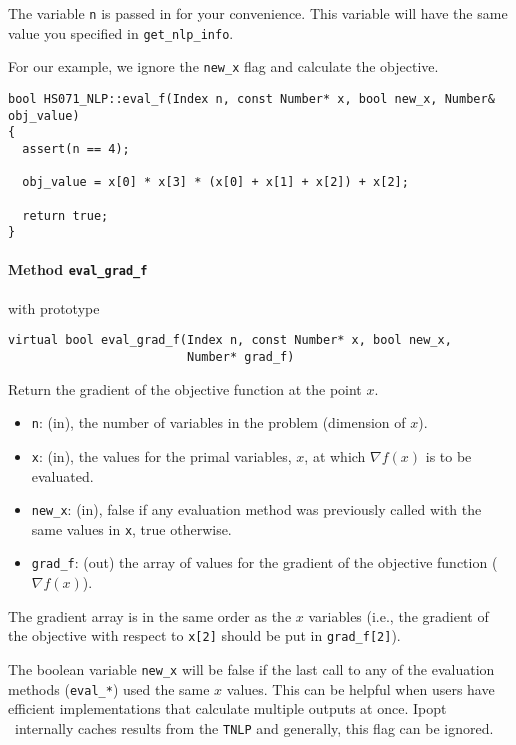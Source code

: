 \documentclass[10pt]{article}
\newcommand{\Ipopt}{{\sc Ipopt }}
\begin{document}
The variable {\tt n} is passed in for your convenience. This variable
will have the same value you specified in {\tt get\_nlp\_info}.

For our example, we ignore the {\tt new\_x} flag and calculate the objective.

\begin{footnotesize}
\begin{verbatim}
bool HS071_NLP::eval_f(Index n, const Number* x, bool new_x, Number& obj_value)
{
  assert(n == 4);

  obj_value = x[0] * x[3] * (x[0] + x[1] + x[2]) + x[2];

  return true;
}
\end{verbatim}
\end{footnotesize}

\paragraph{Method {\texttt{eval\_grad\_f}}} with prototype
\begin{verbatim}
virtual bool eval_grad_f(Index n, const Number* x, bool new_x, 
                         Number* grad_f)
\end{verbatim}
Return the gradient of the objective function at the point $x$.
\begin{itemize}
\item {\tt n}: (in), the number of variables in the problem (dimension of $x$). 
\item {\tt x}: (in), the values for the primal variables, $x$, at which
  $\nabla f(x)$ is to be evaluated.
\item {\tt new\_x}: (in), false if any evaluation method was previously called 
        with the same values in {\tt x}, true otherwise.
\item {\tt grad\_f}: (out) the array of values for the gradient of the 
        objective function ($\nabla f(x)$).
\end{itemize}

The gradient array is in the same order as the $x$ variables (i.e., the
gradient of the objective with respect to {\tt x[2]} should be put in
{\tt grad\_f[2]}).

The boolean variable {\tt new\_x} will be false if the last call to
any of the evaluation methods ({\tt eval\_*}) used the same $x$
values. This can be helpful when users have efficient implementations
that calculate multiple outputs at once. \Ipopt\ internally caches
results from the {\tt TNLP} and generally, this flag can be ignored.
\end{document}
